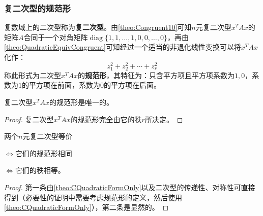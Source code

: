 \subsubsection{复二次型的规范形}
\begin{definition}
	复数域上的二次型称为\textbf{复二次型}。由\cref{theo:Congruent10}可知$n$元复二次型$x^TAx$的矩阵$A$合同于一个对角矩阵$\operatorname{diag}\{1,1,\dots,1,0,0,\dots,0\}$，再由\cref{theo:QuadraticEquivCongruent}可知经过一个适当的非退化线性变换可以将$x^TAx$化作：
	\begin{equation*}
		z_1^2+z_2^2+\cdots+z_r^2
	\end{equation*}
	称此形式为二次型$x^TAx$的\textbf{规范形}，其特征为：只含平方项且平方项系数为$1,0$，系数为$1$的平方项在前面，系数为$0$的平方项在后面。
\end{definition}
\begin{theorem}\label{theo:CQuadraticFormOnly}
	复二次型$x^TAx$的规范形是唯一的。
\end{theorem}
\begin{proof}
	复二次型$x^TAx$的规范形完全由它的秩$r$所决定。
\end{proof}
\begin{theorem}
	两个$n$元复二次型等价\par
	$\Leftrightarrow$它们的规范形相同\par
	$\Leftrightarrow$它们的秩相等。
\end{theorem}
\begin{proof}
	第一条由\cref{theo:CQuadraticFormOnly}以及二次型的传递性、对称性可直接得到（必要性的证明中需要考虑规范形的定义，然后使用\cref{theo:CQuadraticFormOnly}），第二条是显然的。
\end{proof}

